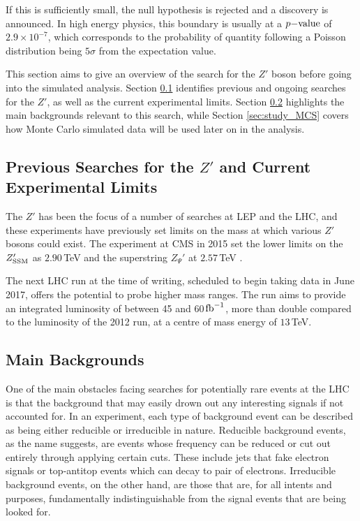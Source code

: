 \documentclass{article}
\begin{document}
If this is sufficiently small, the null hypothesis is rejected and a discovery is announced. In high energy physics, this boundary is usually at a $p\rm{-value}$ of $2.9\times10^{-7}$, which corresponds to the probability of quantity following a Poisson distribution being $5\sigma$ from the expectation value.

This section aims to give an overview of the search for the $Z'$ boson before going into the simulated analysis. Section \ref{sec:study_previousLimits} identifies previous and ongoing searches for the $Z'$, as well as the current experimental limits. Section \ref{sec:study_mainBackgrounds} highlights the main backgrounds relevant to this search, while Section \ref{sec:study_MCS} covers how Monte Carlo simulated data will be used later on in the analysis.

\subsection{Previous Searches for the $Z'$ and Current Experimental Limits}%
\label{sec:study_previousLimits}

The $Z'$ has been the focus of a number of searches at LEP and the LHC, and these experiments have previously set limits on the mass at which various $Z'$ bosons could exist. The experiment at CMS in 2015 set the lower limits on the $Z_{\rm{SSM}}'$ as $2.90\,$TeV and the superstring $Z_{\Psi}'$ at $2.57\,$TeV \cite{CMSDileptonSearch}. 

The next LHC run at the time of writing, scheduled to begin taking data in June 2017, offers the potential to probe higher mass ranges. The run aims to provide an integrated luminosity of between 45 and 60$\,\rm{fb}^{-1}$, more than double compared to the luminosity of the 2012 run, at a centre of mass energy of $13\,$TeV.

\subsection{Main Backgrounds}%
\label{sec:study_mainBackgrounds}

One of the main obstacles facing searches for potentially rare events at the LHC is that the background that may easily drown out any interesting signals if not accounted for. In an experiment, each type of background event can be described as being either reducible or irreducible in nature. Reducible background events, as the name suggests, are events whose frequency can be reduced or cut out entirely through applying certain cuts. These include jets that fake electron signals or top-antitop events which can decay to pair of electrons. Irreducible background events, on the other hand, are those that are, for all intents and purposes, fundamentally indistinguishable from the signal events that are being looked for. 
\end{document}
